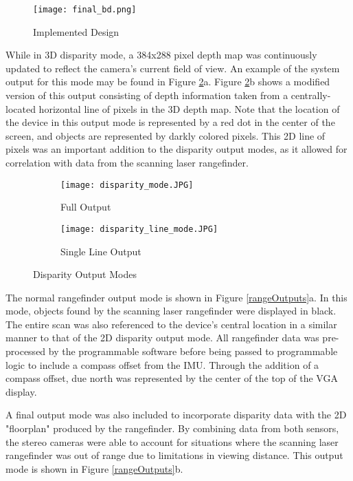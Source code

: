 \begin{figure}[H] 
	\centerline{
	\texttt{[image: final\_bd.png]}
	}
	\caption{Implemented Design}
	\label{finalBD}
\end{figure}

\par
While in 3D disparity mode, a 384x288 pixel depth map was continuously updated to reflect the camera's current field of view. An example of the system output for this mode may be found in Figure \ref{disparityOutputs}a. Figure \ref{disparityOutputs}b shows a modified version of this output consisting of depth information taken from a centrally-located horizontal line of pixels in the 3D depth map. Note that the location of the device in this output mode is represented by a red dot in the center of the screen, and objects are represented by darkly colored pixels. This 2D line of pixels was an important addition to the disparity output modes, as it allowed for correlation with data from the scanning laser rangefinder. 

\begin{figure}[H] 
         \begin{subfigure}[h]{0.5\textwidth}
              \centerline{\texttt{[image: disparity\_mode.JPG]}}
             \caption{Full Output}
         \end{subfigure}
         \begin{subfigure}[h]{0.5\textwidth}
             \centerline{\texttt{[image: disparity\_line\_mode.JPG]}}
             \caption{Single Line Output}
         \end{subfigure}
\caption{Disparity Output Modes}
\label{disparityOutputs}
\end{figure}

The normal rangefinder output mode is shown in Figure \ref{rangeOutputs}a. In this mode, objects found by the scanning laser rangefinder were displayed in black. The entire scan was also referenced to the device's central location in a similar manner to that of the 2D disparity output mode. All rangefinder data was pre-processed by the programmable software before being passed to programmable logic to include a compass offset from the IMU. Through the addition of a compass offset, due north was represented by the center of the top of the VGA display.
\par 
A final output mode was also included to incorporate disparity data with the 2D "floorplan" produced by the rangefinder. By combining data from both sensors, the stereo cameras were able to account for situations where the scanning laser rangefinder was out of range due to limitations in viewing distance. This output mode is shown in Figure \ref{rangeOutputs}b.

